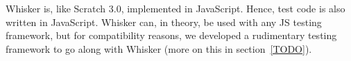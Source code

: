 Whisker is, like Scratch 3.0, implemented in JavaScript.
Hence, test code is also written in JavaScript.
Whisker can, in theory, be used with any JS testing framework,
but for compatibility reasons, we developed a rudimentary testing framework to go along with Whisker (more on this in section~\ref{TODO}).






